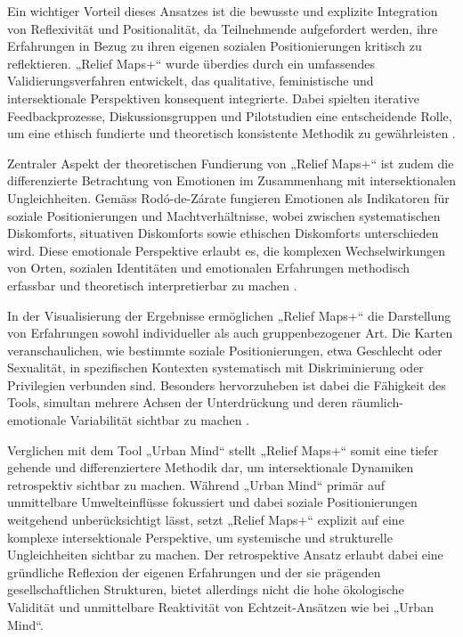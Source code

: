 Ein wichtiger Vorteil dieses Ansatzes ist die bewusste und explizite Integration von Reflexivität und Positionalität, da Teilnehmende aufgefordert werden, ihre Erfahrungen in Bezug zu ihren eigenen sozialen Positionierungen kritisch zu reflektieren. „Relief Maps+“ wurde überdies durch ein umfassendes Validierungsverfahren entwickelt, das qualitative, feministische und intersektionale Perspektiven konsequent integrierte. Dabei spielten iterative Feedbackprozesse, Diskussionsgruppen und Pilotstudien eine entscheidende Rolle, um eine ethisch fundierte und theoretisch konsistente Methodik zu gewährleisten \parencite{luizdesouzaSpiralValidationProcess2025}.

Zentraler Aspekt der theoretischen Fundierung von „Relief Maps+“ ist zudem die differenzierte Betrachtung von Emotionen im Zusammenhang mit intersektionalen Ungleichheiten. Gemäss Rodó-de-Zárate fungieren Emotionen als Indikatoren für soziale Positionierungen und Machtverhältnisse, wobei zwischen systematischen Diskomforts, situativen Diskomforts sowie ethischen Diskomforts unterschieden wird. Diese emotionale Perspektive erlaubt es, die komplexen Wechselwirkungen von Orten, sozialen Identitäten und emotionalen Erfahrungen methodisch erfassbar und theoretisch interpretierbar zu machen \parencite{rodo-de-zarateIntersectionalitySpatialityEmotions2023}.

In der Visualisierung der Ergebnisse ermöglichen „Relief Maps+“ die Darstellung von Erfahrungen sowohl individueller als auch gruppenbezogener Art. Die Karten veranschaulichen, wie bestimmte soziale Positionierungen, etwa Geschlecht oder Sexualität, in spezifischen Kontexten systematisch mit Diskriminierung oder Privilegien verbunden sind. Besonders hervorzuheben ist dabei die Fähigkeit des Tools, simultan mehrere Achsen der Unterdrückung und deren räumlich-emotionale Variabilität sichtbar zu machen \parencite{rodo-de-zarateDevelopingGeographiesIntersectionality2014}.

Verglichen mit dem Tool „Urban Mind“ stellt „Relief Maps+“ somit eine tiefer gehende und differenziertere Methodik dar, um intersektionale Dynamiken retrospektiv sichtbar zu machen. Während „Urban Mind“ primär auf unmittelbare Umwelteinflüsse fokussiert und dabei soziale Positionierungen weitgehend unberücksichtigt lässt, setzt „Relief Maps+“ explizit auf eine komplexe intersektionale Perspektive, um systemische und strukturelle Ungleichheiten sichtbar zu machen. Der retrospektive Ansatz erlaubt dabei eine gründliche Reflexion der eigenen Erfahrungen und der sie prägenden gesellschaftlichen Strukturen, bietet allerdings nicht die hohe ökologische Validität und unmittelbare Reaktivität von Echtzeit-Ansätzen wie bei „Urban Mind“.

